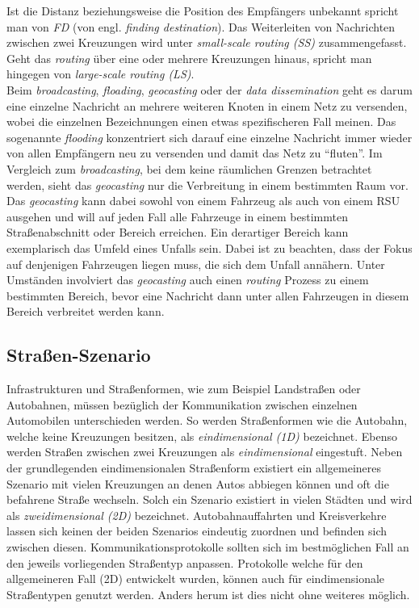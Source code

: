 \documentclass[english,runningheads,a4paper]{llncs}[2018/03/10]
\begin{document}
Ist die Distanz beziehungsweise die Position des Empfängers unbekannt spricht man von \textit{FD} (von engl. \textit{finding destination}).
Das Weiterleiten von Nachrichten zwischen zwei Kreuzungen wird unter \textit{small-scale routing (SS)} zusammengefasst.
Geht das \textit{routing} über eine oder mehrere Kreuzungen hinaus, spricht man hingegen von \textit{large-scale routing (LS)}\cite{conti2013mobile}.\\
Beim \textit{broadcasting}, \textit{floading}, \textit{geocasting} oder der \textit{data dissemination} geht es darum eine einzelne Nachricht an mehrere weiteren Knoten in einem Netz zu versenden, wobei die einzelnen Bezeichnungen einen etwas spezifischeren Fall meinen.
Das sogenannte \textit{flooding} konzentriert sich darauf eine einzelne Nachricht immer wieder von allen Empfängern neu zu versenden und damit das Netz zu ``fluten''.
Im Vergleich zum \textit{broadcasting}, bei dem keine räumlichen Grenzen betrachtet werden, sieht das \textit{geocasting} nur die Verbreitung in einem bestimmten Raum vor.
Das \textit{geocasting} kann dabei sowohl von einem Fahrzeug als auch von einem RSU ausgehen und will auf jeden Fall alle Fahrzeuge in einem bestimmten Straßenabschnitt oder Bereich erreichen.
Ein derartiger Bereich kann exemplarisch das Umfeld eines Unfalls sein.
Dabei ist zu beachten, dass der Fokus auf denjenigen Fahrzeugen liegen muss, die sich dem Unfall annähern.
Unter Umständen involviert das \textit{geocasting} auch einen \textit{routing} Prozess zu einem bestimmten Bereich, bevor eine Nachricht dann unter allen Fahrzeugen in diesem Bereich verbreitet werden kann\cite{conti2013mobile}.

\subsection{Straßen-Szenario}\label{subsec:strassen-szenario}
Infrastrukturen und Straßenformen, wie zum Beispiel Landstraßen oder Autobahnen, müssen bezüglich der Kommunikation zwischen einzelnen Automobilen unterschieden werden.
So werden Straßenformen wie die Autobahn, welche keine Kreuzungen besitzen, als \textit{eindimensional (1D)} bezeichnet.
Ebenso werden Straßen zwischen zwei Kreuzungen als \textit{eindimensional} eingestuft.
Neben der grundlegenden eindimensionalen Straßenform existiert ein allgemeineres Szenario mit vielen Kreuzungen an denen Autos abbiegen können und oft die befahrene Straße wechseln.
Solch ein Szenario existiert in vielen Städten und wird als \textit{zweidimensional (2D)} bezeichnet.
Autobahnauffahrten und Kreisverkehre lassen sich keinen der beiden Szenarios eindeutig zuordnen und befinden sich zwischen diesen.
Kommunikationsprotokolle sollten sich im bestmöglichen Fall an den jeweils vorliegenden Straßentyp anpassen.
Protokolle welche für den allgemeineren Fall (2D) entwickelt wurden, können auch für eindimensionale Straßentypen genutzt werden.
Anders herum ist dies nicht ohne weiteres möglich\cite{conti2013mobile}.
\end{document}
